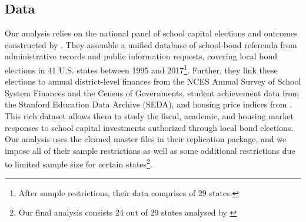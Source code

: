 \subsection{Data}

Our analysis relies on the national panel of school capital elections and outcomes constructed by \citet{biasi_what_2025}. They assemble a unified database of school-bond referenda from administrative records and public information requests, covering local bond elections in 41 U.S. states between 1995 and 2017\footnote{After sample restrictions, their data comprises of 29 states.}. Further, they link these elections to annual district-level finances from the NCES Annual Survey of School System Finances and the Census of Governments, student achievement data from the Stanford Education Data Archive (SEDA), and housing price indices from \citet{contat_larson_2024}. This rich dataset allows them to study the fiscal, academic, and housing market responses to school capital investments authorized through local bond elections. Our analysis uses the cleaned master files in their replication package, and we impose all of their sample restrictions as well as some additional restrictions due to limited sample size for certain states\footnote{Our final analysis consists 24 out of 29 states analysed by \cite{biasi_what_2025}}.



